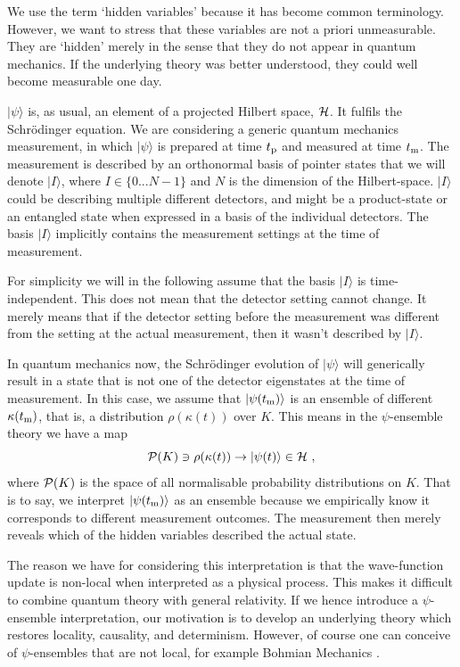 \documentclass[superscriptaddress,floatfix,nofootinbib,12pt]{revtex4-2}
\begin{document}
We use the term `hidden variables' because it has become common terminology. However, we want to stress that these variables are not a priori unmeasurable. They are `hidden' merely in the sense that they do not appear in quantum mechanics. If the underlying theory was better understood, they could well become measurable one day. 

$|\psi \rangle$ is, as usual, an element of a projected Hilbert space, ${\cal H}$. It fulfils the Schr\"odinger equation. We are considering a generic quantum mechanics measurement, in which $|\psi \rangle$ is prepared at time $t_{\rm p}$ and measured at time $t_{\rm m}$. The measurement is described by an orthonormal basis of pointer states that we will denote $|I \rangle$, where $I \in \{0... N-1\}$ and $N$ is the dimension of the Hilbert-space. $|I\rangle$ could be describing multiple different detectors, and might be a product-state or an entangled state when expressed in a basis of the individual detectors. The basis $|I\rangle$ implicitly contains the measurement settings at the time of measurement. 

For simplicity we will in the following assume that the basis $|I \rangle$ is time-independent. This does not mean that the detector setting cannot change. It merely means that if the detector setting before the measurement was different from the setting at the actual measurement, then it wasn't described by $|I\rangle$. 

In quantum mechanics now, the Schr\"odinger evolution of $|\psi\rangle$ will generically result in a state that is not one of the detector eigenstates at the time of measurement. In this case, we assume that $|\psi(t_{\rm m}) \rangle$ is an ensemble of different $\kappa(t_{\rm m})$, that is, a distribution $\rho(\kappa(t))$ over $K$. This means in the $\psi$-ensemble theory we have a map
\begin{equation}
    {\cal P}(K) \ni \rho(\kappa(t))\to |\psi(t) \rangle \in {\cal H}~,
\end{equation}
where ${\cal P}(K)$ is the space of all normalisable probability distributions on $K$.
That is to say, we interpret $|\psi(t_{\rm m}) \rangle$ as an ensemble because we empirically know it corresponds to different measurement outcomes. The measurement then merely reveals which of the hidden variables described the actual state. 

The reason we have for considering this interpretation is that the wave-function update is non-local when interpreted as a physical process. This makes it difficult to combine quantum theory with general relativity. If we hence introduce a $\psi$-ensemble interpretation, our  motivation is to develop an underlying theory which restores locality, causality, and determinism. However, of course one can conceive of $\psi$-ensembles that are not local, for example Bohmian Mechanics \cite{Bohm1952Bohm}.
\end{document}
